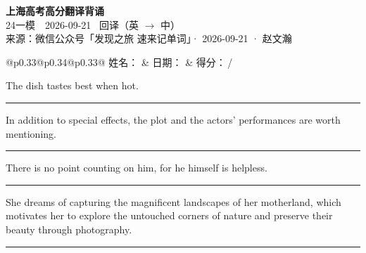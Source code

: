 \documentclass[11pt,a4paper]{article}
\newcommand{\num}[1]{\makebox[1.9em][r]{#1.}\hspace{0.3em}}
\newcommand{\wline}{\noindent\rule{\linewidth}{0.4pt}}
\begin{document}
\pagestyle{plain}
\begin{center}
{\LARGE\bfseries 上海高考高分翻译背诵 }\\[0.25em]
{\large 24一模　2026-09-21 \quad\ 回译（英 $\to$ 中）}\\[0.35em]
{\footnotesize 来源：微信公众号「发现之旅 速来记单词」· 2026-09-21 · 赵文瀚}
\end{center}

\vspace{0.4em}
\noindent\begin{tabular}{@{}p{0.33\textwidth}@{}p{0.34\textwidth}@{}p{0.33\textwidth}@{}}
姓名：\underline{\hspace{2.0cm}} & 日期：\underline{\hspace{2.0cm}} & 得分：\underline{\hspace{1.4cm}}\,/ \\
\end{tabular}

\vspace{0.5em}

\vspace{0.8em}
\num{1}The dish tastes best when hot.

\vspace{0.25em}

\wline

\num{2}In addition to special effects, the plot and the actors’ performances are worth mentioning.

\vspace{0.25em}

\wline

\num{3}There is no point counting on him, for he himself is helpless.

\vspace{0.25em}

\wline

\num{4}She dreams of capturing the magnificent landscapes of her motherland, which motivates her to explore the untouched corners of nature and preserve their beauty through photography.

\vspace{0.25em}

\wline
\end{document}
